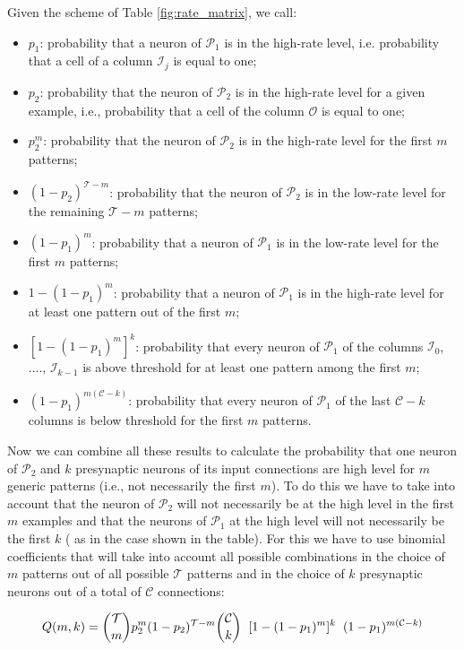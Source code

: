 \documentclass[a4paper, 12pt, twoside, openright]{book}
\newcommand{\popI}{\mathcal{P}_1}
\newcommand{\popII}{\mathcal{P}_2}
\newcommand{\T}{\mathcal{T}}
\newcommand{\C}{\mathcal{C}}
\begin{document}
Given the scheme of Table \ref{fig:rate_matrix}, we call:
\begin{itemize}
    \item $p_1$: probability that a neuron of $\popI$ is in the high-rate level, i.e. probability that a cell of a column $\mathcal{I}_j$ is equal to one;
    \item $p_2$: probability that the neuron of $\popII$ is in the high-rate level for a given example, i.e., probability that a cell of the column $\mathcal{O}$ is equal to one;
    \item $p_2^m$: probability that the neuron of $\popII$ is in the high-rate level for the first $m$ patterns;
    \item $(1-p_2)^{\T - m}$: probability that the neuron of $\popII$ is in the low-rate level for the remaining $\T - m$ patterns;
    \item $(1-p_1)^m$: probability that a neuron of $\popI$ is in the low-rate level for the first $m$ patterns;
    \item $1-(1-p_1)^m$: probability that a neuron of $\popI$ is in the high-rate level for at least one pattern out of the first $m$;
    \item $[1-(1-p_1)^m]^{k}$: probability that every neuron of $\popI$ of the columns
    $\mathcal{I}_0$, ...., $\mathcal{I}_{k-1}$
    is above threshold for at least one pattern among the first $m$;
    \item $(1-p_1)^{m(\C-k)}$: probability that every neuron of $\popI$ of the last $\C - k$ columns is below threshold for the first $m$ patterns.
\end{itemize}

Now we can combine all these results to calculate the probability that one neuron of $\popII$ and $k$ presynaptic neurons of its input connections are high level for $m$ generic patterns (i.e., not necessarily the first $m$). To do this we have to take into account that the neuron of $\popII$ will not necessarily be at the high level in the first $m$ examples and that the neurons of $\popI$ at the high level will not necessarily be the first $k$ ( as in the case shown in the table). 
For this we have to use binomial coefficients that will take into account all possible combinations
in the choice of $m$ patterns out of all possible $\T$ patterns and in the choice of $k$ presynaptic neurons out of a total of $\C$ connections:

\begin{equation}
\label{eq:Q_mk}
    Q(m,k) = \binom{\T}{m} p_{2}^m (1-p_2)^{\T-m}
    \binom{\C}{k}  \hspace{2mm} [1-(1-p_1)^m]^k  \hspace{2mm} (1-p_1)^{m(\C-k)} 
\end{equation}
\end{document}
